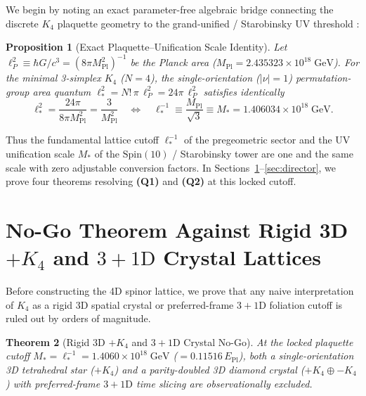 \documentclass[11pt,a4paper]{article}
\newtheorem{theorem}{Theorem}[section]
\newtheorem{proposition}[theorem]{Proposition}
\begin{document}
We begin by noting an exact parameter-free algebraic bridge connecting the discrete $K_4$ plaquette geometry \cite{Olcsak2026JMP} to the grand-unified / Starobinsky UV threshold \cite{Olcsak2026Paper24,Olcsak2026Paper25,Olcsak2026Paper26}:

\begin{proposition}[Exact Plaquette--Unification Scale Identity]
\label{prop:scale-identity}
Let $\ell_P^2 \equiv \hbar G/c^3 = (8\pi M_{\mathrm{Pl}}^2)^{-1}$ be the Planck area ($M_{\mathrm{Pl}} = 2.435323\times 10^{18}\;\mathrm{GeV}$). For the minimal 3-simplex $K_4$ ($N = 4$), the single-orientation ($|\nu|=1$) permutation-group area quantum $\ell_*^2 = N!\,\pi\,\ell_P^2 = 24\pi\,\ell_P^2$ satisfies identically
\begin{equation}
\ell_*^2 = \frac{24\pi}{8\pi M_{\mathrm{Pl}}^2} = \frac{3}{M_{\mathrm{Pl}}^2}
\quad\Longleftrightarrow\quad
\ell_*^{-1} \equiv \frac{M_{\mathrm{Pl}}}{\sqrt{3}} \equiv M_* = 1.406034\times 10^{18}\;\mathrm{GeV}.
\label{eq:plaquette-unification-identity}
\end{equation}
\end{proposition}

Thus the fundamental lattice cutoff $\ell_*^{-1}$ of the pregeometric sector and the UV unification scale $M_*$ of the $\mathrm{Spin}(10)$ / Starobinsky tower are one and the same scale with zero adjustable conversion factors. In Sections~\ref{sec:nogo}--\ref{sec:director}, we prove four theorems resolving \textbf{(Q1)} and \textbf{(Q2)} at this locked cutoff.

\section{No-Go Theorem Against Rigid 3D \texorpdfstring{$+K_4$}{+K4} and \texorpdfstring{$3+1\mathrm{D}$}{3+1D} Crystal Lattices}
\label{sec:nogo}

Before constructing the 4D spinor lattice, we prove that any naive interpretation of $K_4$ as a rigid 3D spatial crystal or preferred-frame $3+1\mathrm{D}$ foliation cutoff is ruled out by orders of magnitude.

\begin{theorem}[Rigid 3D $+K_4$ and $3+1\mathrm{D}$ Crystal No-Go]
\label{thm:3d-nogo}
At the locked plaquette cutoff $M_* = \ell_*^{-1} = 1.4060\times 10^{18}\;\mathrm{GeV}$ ($= 0.11516\,E_{\mathrm{Pl}}$), both a single-orientation 3D tetrahedral star ($+K_4$) and a parity-doubled 3D diamond crystal ($+K_4 \oplus -K_4$) with preferred-frame $3+1\mathrm{D}$ time slicing are observationally excluded.
\end{theorem}
\end{document}
